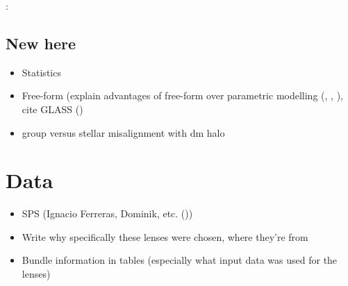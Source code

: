 \documentclass[10pt]{article}
\begin{document}
\textbf{\cite{2000ApJ...536..584L}}: 


\subsection{New here}
\begin{itemize}
\item Statistics
\item Free-form (explain advantages of free-form over parametric modelling (\cite{2004AJ....127.2604S}, \cite{2012MNRAS.425.3077L}, \cite{2008ApJ...681..814C}), cite GLASS (\cite{2012MNRAS.425.3077L})
\item group versus stellar misalignment with dm halo
\end{itemize}



\section{Data}
\begin{itemize}
\item SPS (Ignacio Ferreras, Dominik, etc. (\cite{2011ApJ...740...97L}))
\item Write why specifically these lenses were chosen, where they're from
\item Bundle information in tables (especially what input data was used for the lenses)
\end{itemize}
\end{document}
